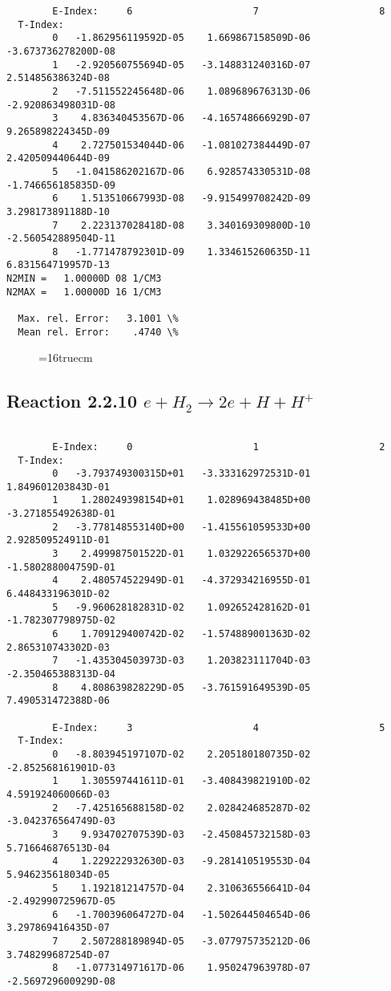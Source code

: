\documentclass[12pt,dvipdfmx]{article}
\begin{document}
{\begin{small}
\begin{verbatim}
        E-Index:     6                     7                     8
  T-Index:
        0   -1.862956119592D-05    1.669867158509D-06   -3.673736278200D-08
        1   -2.920560755694D-05   -3.148831240316D-07    2.514856386324D-08
        2   -7.511552245648D-06    1.089689676313D-06   -2.920863498031D-08
        3    4.836340453567D-06   -4.165748666929D-07    9.265898224345D-09
        4    2.727501534044D-06   -1.081027384449D-07    2.420509440644D-09
        5   -1.041586202167D-06    6.928574330531D-08   -1.746656185835D-09
        6    1.513510667993D-08   -9.915499708242D-09    3.298173891188D-10
        7    2.223137028418D-08    3.340169309800D-10   -2.560542889504D-11
        8   -1.771478792301D-09    1.334615260635D-11    6.831564719957D-13
N2MIN =   1.00000D 08 1/CM3
N2MAX =   1.00000D 16 1/CM3

  Max. rel. Error:   3.1001 \%
  Mean rel. Error:    .4740 \%

\end{verbatim}\end{small}
\begin{figure} \label{2.2.9}
\epsfxsize=16truecm
\end{figure}
\newpage

\subsection{
Reaction 2.2.10  $ e + H_2  \rightarrow 2e + H + H^+  $ }

\begin{small}\begin{verbatim}

        E-Index:     0                     1                     2
  T-Index:
        0   -3.793749300315D+01   -3.333162972531D-01    1.849601203843D-01
        1    1.280249398154D+01    1.028969438485D+00   -3.271855492638D-01
        2   -3.778148553140D+00   -1.415561059533D+00    2.928509524911D-01
        3    2.499987501522D-01    1.032922656537D+00   -1.580288004759D-01
        4    2.480574522949D-01   -4.372934216955D-01    6.448433196301D-02
        5   -9.960628182831D-02    1.092652428162D-01   -1.782307798975D-02
        6    1.709129400742D-02   -1.574889001363D-02    2.865310743302D-03
        7   -1.435304503973D-03    1.203823111704D-03   -2.350465388313D-04
        8    4.808639828229D-05   -3.761591649539D-05    7.490531472388D-06

        E-Index:     3                     4                     5
  T-Index:
        0   -8.803945197107D-02    2.205180180735D-02   -2.852568161901D-03
        1    1.305597441611D-01   -3.408439821910D-02    4.591924060066D-03
        2   -7.425165688158D-02    2.028424685287D-02   -3.042376564749D-03
        3    9.934702707539D-03   -2.450845732158D-03    5.716646876513D-04
        4    1.229222932630D-03   -9.281410519553D-04    5.946235618034D-05
        5    1.192181214757D-04    2.310636556641D-04   -2.492990725967D-05
        6   -1.700396064727D-04   -1.502644504654D-06    3.297869416435D-07
        7    2.507288189894D-05   -3.077975735212D-06    3.748299687254D-07
        8   -1.077314971617D-06    1.950247963978D-07   -2.569729600929D-08


\end{verbatim}
\end{small}}
\end{document}
